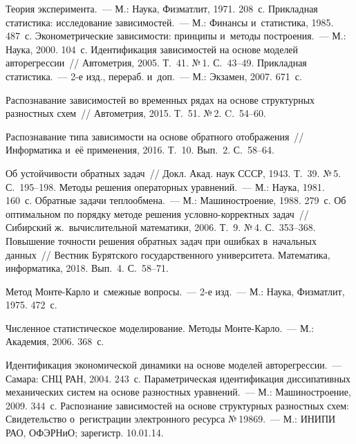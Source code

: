 \begin{multicols}{2}
{{\begin{thebibliography}{99}
   
     Теория эксперимента.~--- М.: Наука, Физматлит, 1971. 
208~с.
     Прикладная 
статистика: исследование зависимостей.~--- М.: Финансы и~статистика, 1985. 
487~с.
     Эконометрические зависимости: 
принципы и~методы построения.~--- М.: Наука, 2000. 104~с.
     Идентификация зависимостей на основе моделей 
авторегрессии~// Автометрия, 2005. Т.~41. №\,1. С.~43--49.
     Прикладная статистика.~--- 2-е изд., перераб. и~доп.~--- 
М.: Экзамен, 2007. 671~с.

     Распознавание зависимостей во 
временных рядах на основе структурных разностных схем~// Автометрия, 2015. 
Т.~51. №\,2. C.~54--60.

     Распознавание типа зависимости 
на основе обратного отображения~// Информатика и~её применения, 2016. 
Т.~10. Вып.~2. С.~58--64.
   
    
     Об устойчивости обратных задач~// Докл. Акад. наук СССР, 1943. 
Т.~39. №\,5. С.~195--198.
     Методы решения операторных уравнений.~--- М.: 
Наука, 1981. 160~с.
     Обратные задачи теплообмена.~--- М.: 
Машиностроение, 1988. 279~с.
     Об оптимальном по порядку методе 
решения условно-корректных задач~// Сибирский ж.~вычислительной 
математики, 2006. Т.~9. №\,4. С.~353--368.
     Повышение точ\-ности решения 
обратных задач при ошибках в~начальных данных~// Вестник Бурятского 
государственного университета. Математика, информатика, 2018. Вып.~4. 
С.~58--71. 
   
     Метод Мон\-те-Кар\-ло и~смежные вопросы.~--- 2-е 
изд.~--- М.: Наука, Физматлит, 1975. 472~с. 

     Численное статистическое 
моделирование. Методы Мон\-те-Кар\-ло.~--- М.: Академия, 2006. 368~с.

     Идентификация экономической динамики на основе 
моделей авторегрессии.~--- Самара: СНЦ РАН, 2004. 243~с.
     Параметрическая идентификация диссипативных 
механических систем на основе разностных уравнений.~--- М.: 
Машиностроение, 2009. 344~с.
     Распознание зависимостей на основе 
структурных разностных схем: Свидетельство о~регистрации электронного 
ресурса №\,19869.~--- М.: ИНИПИ РАО, ОФЭРНиО; зарегистр. 10.01.14.
 \end{thebibliography}

 }
 }

\end{multicols}

